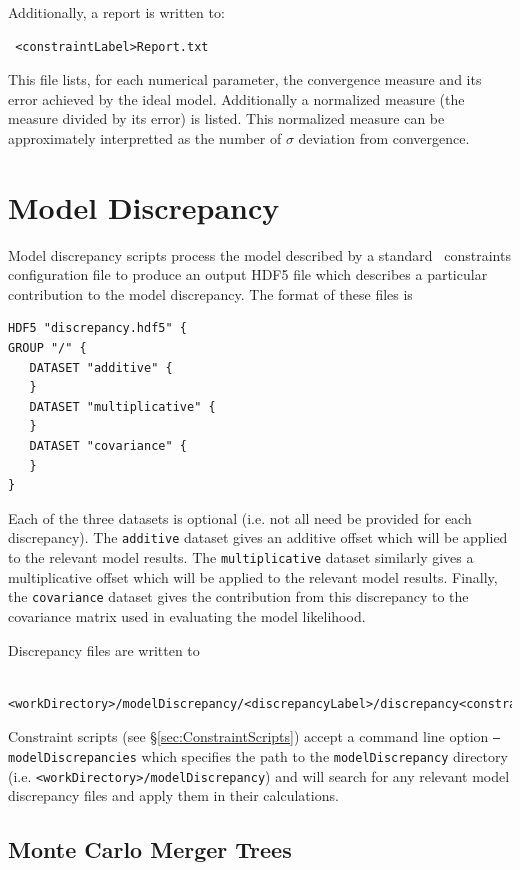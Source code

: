 Additionally, a report is written to:
\begin{verbatim}
 <constraintLabel>Report.txt
\end{verbatim}
This file lists, for each numerical parameter, the convergence measure and its error achieved by the ideal model. Additionally a normalized measure (the measure divided by its error) is listed. This normalized measure can be approximately interpretted as the number of $\sigma$ deviation from convergence.

\section{Model Discrepancy}\label{sec:ModelDiscrepancy}

Model discrepancy scripts process the model described by a standard \glc\ constraints configuration file to produce an output HDF5 file which describes a particular contribution to the model discrepancy. The format of these files is
\begin{verbatim}
HDF5 "discrepancy.hdf5" {
GROUP "/" {
   DATASET "additive" {
   }
   DATASET "multiplicative" {
   }
   DATASET "covariance" {
   }
}
\end{verbatim}
Each of the three datasets is optional (i.e. not all need be provided for each discrepancy). The {\tt additive} dataset gives an additive offset which will be applied to the relevant model results. The {\tt multiplicative} dataset similarly gives a multiplicative offset which will be applied to the relevant model results. Finally, the {\tt covariance} dataset gives the contribution from this discrepancy to the covariance matrix used in evaluating the model likelihood.

Discrepancy files are written to
\begin{verbatim}
 <workDirectory>/modelDiscrepancy/<discrepancyLabel>/discrepancy<constraintLabel>.hdf5
\end{verbatim}

Constraint scripts (see \S\ref{sec:ConstraintScripts}) accept a command line option {\tt --modelDiscrepancies} which specifies the path to the {\tt modelDiscrepancy} directory (i.e. {\tt <workDirectory>/modelDiscrepancy}) and will search for any relevant model discrepancy files and apply them in their calculations.

\subsection{Monte Carlo Merger Trees}

